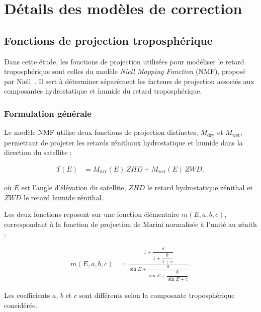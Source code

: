 
\chapter{Détails des modèles de correction}
\thispagestyle{fancy}
\label{annexA}


\section{Fonctions de projection troposphérique}
\label{annexe:nmf}

Dans cette étude, les fonctions de projection utilisées pour modéliser le
retard troposphérique sont celles du modèle \textit{Niell Mapping Function}
(NMF), proposé par Niell~\cite{niell1996}. Il sert à déterminer
séparément les facteurs de projection associés aux composantes hydrostatique
et humide du retard troposphérique.

\subsection*{Formulation générale}

Le modèle NMF utilise deux fonctions de projection distinctes,
$M_{\mathrm{dry}}$ et $M_{\mathrm{wet}}$, permettant de projeter les retards
zénithaux hydrostatique et humide dans la direction du satellite :

\begin{align}
T(E)
&=
M_{\mathrm{dry}}(E)\,ZHD
+
M_{\mathrm{wet}}(E)\,ZWD,
\end{align}

où $E$ est l'angle d'élévation du satellite, $ZHD$ le retard hydrostatique
zénithal et $ZWD$ le retard humide zénithal.

Les deux fonctions reposent sur une fonction élémentaire $m(E,a,b,c)$,
correspondant à la fonction de projection de Marini normalisée à l'unité au
zénith :

\begin{align}
m(E,a,b,c)
&=
\frac{
1+\dfrac{a}{1+\dfrac{b}{1+c}}
}{
\sin E+
\dfrac{a}{\sin E+\dfrac{b}{\sin E+c}}
}.
\label{eq:marini_mapping}
\end{align}

Les coefficients $a$, $b$ et $c$ sont différents selon la composante
troposphérique considérée.

